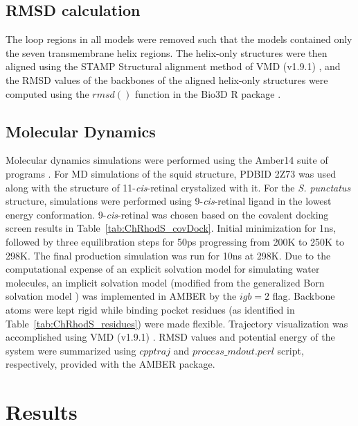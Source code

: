 \subsection*{RMSD calculation}
The loop regions in all models were removed such that the models contained only the seven transmembrane helix regions. The helix-only structures were then aligned using the STAMP Structural alignment method \cite{Russell1992} of VMD (v1.9.1) \cite{Humphrey1996}, and the RMSD values of the backbones of the aligned helix-only structures were computed using the $rmsd()$ function in the Bio3D R package \cite{Grant2006}.\\
\subsection*{Molecular Dynamics}
Molecular dynamics simulations were performed using the Amber14 suite of programs \cite{AMBER2015}. For MD simulations of the squid structure, PDBID 2Z73 was used along with the structure of 11-\textit{cis}-retinal crystalized with it. For the \textit{S. punctatus} structure, simulations were performed using 9-\textit{cis}-retinal ligand in the lowest energy conformation. 9-\textit{cis}-retinal was chosen based on the covalent docking screen results in Table~\ref{tab:ChRhodS_covDock}. Initial minimization for 1ns, followed by three equilibration steps for 50ps progressing from 200K to 250K to 298K. The final production simulation was run for 10ns at 298K. Due to the computational expense of an explicit solvation model for simulating water molecules, an implicit solvation model \cite{Onufriev2000} (modified from the generalized Born solvation model \cite{Bashford2000}) was implemented in AMBER by the $igb=2$ flag. Backbone atoms were kept rigid while binding pocket residues (as identified in Table~\ref{tab:ChRhodS_residues}) were made flexible. Trajectory visualization was accomplished using VMD (v1.9.1) \cite{Humphrey1996}. RMSD values and potential energy of the system were summarized using $cpptraj$ and $process\_mdout.perl$ script, respectively, provided with the AMBER package.\\

\section{Results}
